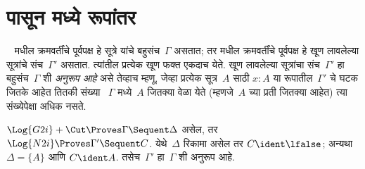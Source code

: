 \section{ पासून  मध्ये रूपांतर}\label{pt:nat:tgi:sec}

~ मधील क्रमवर्तींचे पूर्वपक्ष हे
सूत्रे यांचे बहुसंच~$\Gamma$ असतात; तर
 मधील क्रमवर्तींचे पूर्वपक्ष हे
खूण लावलेल्या सूत्रांचे संच~$\Gamma'$ असतात.
त्यांतील प्रत्येक खूण फक्त एकदाच येते.
खूण लावलेल्या सूत्रांचा संच~$\Gamma'$
हा बहुसंच~$\Gamma$ शी \emph{अनुरूप आहे} असे
तेव्हाच म्हणू, जेव्हा प्रत्येक सूत्र~$A$
साठी $x : A$ या रूपातील~$\Gamma'$ चे
घटक जितके आहेत तितकी संख्या
~$\Gamma$ मध्ये~$A$ जितक्या वेळा येते
(म्हणजे~$A$ च्या प्रती जितक्या आहेत) त्या
संख्येपेक्षा अधिक नसते.

\begin{prop}\label{pt:nat:tgi:prop:G2i-to-N2i}
$\Log{G2i} + \Cut \Proves \Gamma \Sequent \Delta$
असेल, तर
$\Log{N2i} \Proves \Gamma' \Sequent C$.
येथे~$\Delta$ रिकामा असेल तर
$C \ident \lfalse$; अन्यथा
$\Delta = \{A\}$ आणि $C \ident A$.
तसेच~$\Gamma'$ हा~$\Gamma$ शी अनुरूप आहे.
\end{prop}

